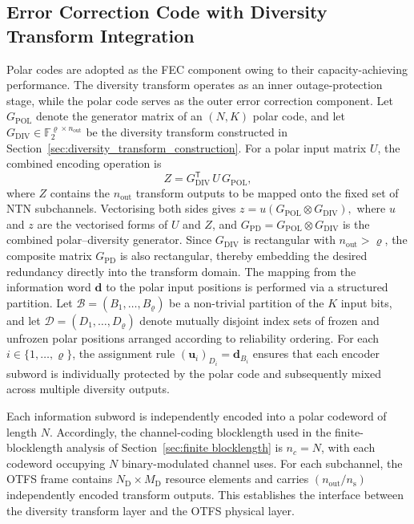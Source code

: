 \documentclass[journal]{IEEEtran}
\begin{document}
\subsection{Error Correction Code with Diversity Transform 
Integration}
\label{subsec:polar_diversity}

Polar codes are adopted as the FEC component owing to their capacity-achieving performance. The diversity transform operates as an inner 
outage-protection stage, while the polar code serves as the outer 
error correction component. Let $G_{\text{POL}}$ denote the generator 
matrix of an $(N,K)$ polar code, and let 
$G_{\text{DIV}} \in \mathbb{F}_2^{\varrho \times n_{\text{out}}}$ be 
the diversity transform constructed in 
Section~\ref{sec:diversity_transform_construction}. For a polar input 
matrix $U$, the combined encoding operation is
\begin{equation}
Z = G_{\text{DIV}}^{\mathsf{T}}\, U\, G_{\text{POL}},
\end{equation}
where $Z$ contains the $n_{\text{out}}$ transform outputs to be 
mapped onto the fixed set of NTN subchannels. Vectorising both sides 
gives $ z = u\left(G_{\text{POL}} \otimes G_{\text{DIV}}\right),$
where $u$ and $z$ are the vectorised forms of $U$ and $Z$, and 
$G_{\text{PD}} = G_{\text{POL}} \otimes G_{\text{DIV}}$ is the 
combined polar--diversity generator. Since $G_{\text{DIV}}$ is 
rectangular with $n_{\text{out}} > \varrho$, the composite matrix 
$G_{\text{PD}}$ is also rectangular, thereby embedding the desired 
redundancy directly into the transform domain. The mapping from the 
information word $\mathbf{d}$ to the polar input positions is 
performed via a structured partition. Let 
$\mathcal{B} = (B_1,\ldots,B_\varrho)$ be a non-trivial partition 
of the $K$ input bits, and let 
$\mathcal{D} = (D_1,\ldots,D_\varrho)$ denote mutually disjoint 
index sets of frozen and unfrozen polar positions arranged according 
to reliability ordering. For each $i \in \{1,\ldots,\varrho\}$, 
the assignment rule $(\mathbf{u}_i)_{D_i} = \mathbf{d}_{B_i}$ ensures that each encoder subword is individually protected by the
polar code and subsequently mixed across multiple diversity outputs.

 Each information subword is independently encoded into a polar codeword of length $N$. Accordingly, the channel-coding blocklength used in the finite-blocklength analysis of Section~\ref{sec:finite blocklength} is $n_c = N$, with each codeword occupying $N$ binary-modulated channel uses. For each subchannel, the OTFS frame contains $N_{\mathrm{D}} \times M_{\mathrm{D}}$ resource elements and carries $(n_{\mathrm{out}}/n_{\mathrm{s}})$ independently encoded transform outputs. This establishes the
interface between the diversity transform layer and the OTFS physical layer.
\end{document}
